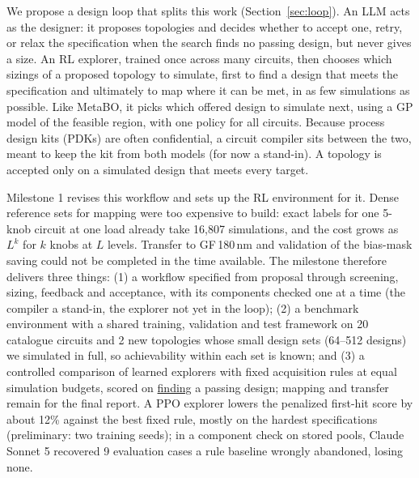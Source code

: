 \documentclass[10pt]{article}
\begin{document}
We propose a design loop that splits this work (Section~\ref{sec:loop}). An LLM acts as the designer: it proposes
topologies and decides whether to accept one, retry, or relax the specification when the search finds no passing design, but never
gives a size. An RL explorer, trained once across many circuits, then chooses which sizings of a proposed topology to
simulate, first to find a design that meets the specification and ultimately to map where it can be met, in as few
simulations as possible. Like MetaBO, it picks which offered design to simulate next, using a GP model of the feasible
region, with one policy for all circuits. Because
process design kits (PDKs) are often confidential, a circuit compiler sits between the two, meant to keep the kit
from both models (for now a stand-in). A topology is accepted only
on a simulated design that meets every target.

Milestone 1 revises this workflow and sets up the RL environment for it. Dense reference sets for mapping were too
expensive to build: exact labels for one 5-knob circuit at one load already take 16,807 simulations, and the cost
grows as $L^k$ for $k$ knobs at $L$ levels. Transfer to GF\,180\,nm and validation of the bias-mask saving could not be
completed in the time available. The milestone therefore delivers three things:
(1) a workflow specified from proposal through screening, sizing, feedback and acceptance, with its components
checked one at a time (the compiler a stand-in, the explorer
not yet in the loop); (2) a benchmark
environment with a shared training, validation and test framework on 20 catalogue circuits and 2 new topologies whose small design sets (64--512 designs) we simulated in
full, so achievability within each set is known; and (3) a controlled comparison of learned explorers with fixed
acquisition rules at equal simulation budgets, scored on \uline{finding} a passing design; mapping and transfer remain for the final report. A PPO explorer lowers the penalized first-hit score by
about 12\% against the best fixed rule, mostly on the hardest specifications (preliminary: two training seeds); in a
component check on stored pools, Claude Sonnet 5 recovered 9 evaluation cases a rule baseline
wrongly abandoned, losing none.


\end{document}
